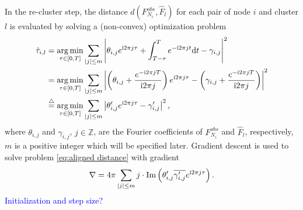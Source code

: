 		In the re-cluster step, the distance $d(F_{N_i}^{obs}, \hat F_l)$ for each pair of node $i$ and cluster $l$ is evaluated by solving a (non-convex) optimization problem
		\begin{equation}
		\begin{aligned}\label{eq:aligned distance}
		\hat\tau_{i,l}&=\underset{\tau\in[0,T]}{\arg\min}\sum_{|j|\leq m}\left| \theta_{i,j}e^{\complexunit 2\pi j\tau}+\int_{T-\tau}^Te^{-\complexunit2\pi jt}\text{d}t -\gamma_{i,j} \right|^2\\
		&=\underset{\tau\in[0,T]}{\arg\min}\sum_{|j|\leq m}\left| \left( \theta_{i,j}+\frac{e^{-\complexunit2\pi jT}}{\complexunit2\pi j} \right) e^{\complexunit2\pi j\tau} - \left( \gamma_{i,j}+\frac{e^{-\complexunit2\pi jT}}{\complexunit2\pi j} \right)  \right|^2 \\
		&\overset{\triangle}{=}\underset{\tau\in[0,T]}{\arg\min}\sum_{|j|\leq m}\left| \theta_{i,j}' e^{\complexunit2\pi j\tau} - {\gamma_{i,j}'}  \right|^2
		,
		\end{aligned}
		\end{equation}
		where $\theta_{i,j}$ and $\gamma_{i,j}$, $j\in \mathbb{Z}$, are the Fourier coefficients of $F_{N_i}^{obs}$ and $\hat F_l$, respectively,
		$m$ is a positive integer which will be specified later.
		Gradient descent is used to solve problem \eqref{eq:aligned distance} with gradient
		\begin{equation}
		\nabla = 4\pi \sum_{|j|\leq m} j\cdot \text{Im}\left( {\theta_{i,j}'}\overline{{\gamma_{i,j}'}}e^{\complexunit2\pi j\tau} \right) .
		\end{equation}
		\textcolor{blue}{Initialization and step size?}
		


